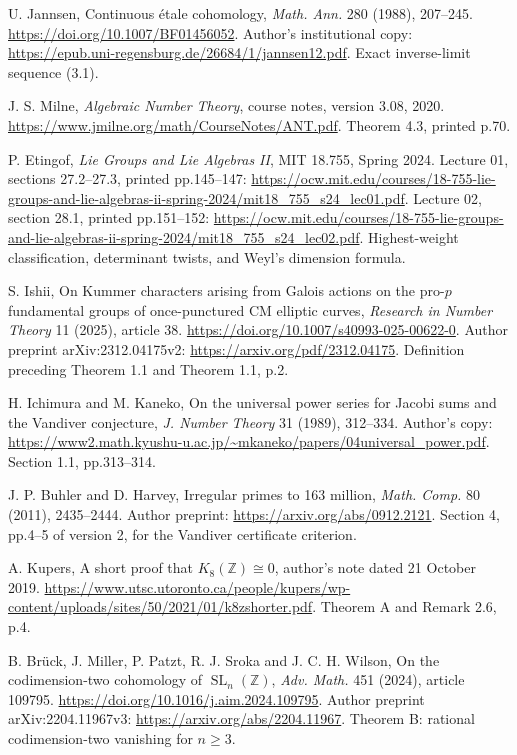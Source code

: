 U. Jannsen, Continuous \'etale cohomology,
\emph{Math. Ann.} 280 (1988), 207--245.
\url{https://doi.org/10.1007/BF01456052}.
Author's institutional copy:
\url{https://epub.uni-regensburg.de/26684/1/jannsen12.pdf}.
Exact inverse-limit sequence (3.1).

J. S. Milne, \emph{Algebraic Number Theory},
course notes, version 3.08, 2020.
\url{https://www.jmilne.org/math/CourseNotes/ANT.pdf}.
Theorem 4.3, printed p.70.

P. Etingof, \emph{Lie Groups and Lie Algebras II},
MIT 18.755, Spring 2024.
Lecture 01, sections 27.2--27.3, printed pp.145--147:
\url{https://ocw.mit.edu/courses/18-755-lie-groups-and-lie-algebras-ii-spring-2024/mit18_755_s24_lec01.pdf}.
Lecture 02, section 28.1, printed pp.151--152:
\url{https://ocw.mit.edu/courses/18-755-lie-groups-and-lie-algebras-ii-spring-2024/mit18_755_s24_lec02.pdf}.
Highest-weight classification, determinant twists, and Weyl's dimension formula.

S. Ishii,
On Kummer characters arising from Galois actions on the pro-\(p\)
fundamental groups of once-punctured CM elliptic curves,
\emph{Research in Number Theory} 11 (2025), article 38.
\url{https://doi.org/10.1007/s40993-025-00622-0}.
Author preprint arXiv:2312.04175v2:
\url{https://arxiv.org/pdf/2312.04175}.
Definition preceding Theorem 1.1 and Theorem 1.1, p.2.

H. Ichimura and M. Kaneko,
On the universal power series for Jacobi sums and the Vandiver conjecture,
\emph{J. Number Theory} 31 (1989), 312--334.
Author's copy:
\url{https://www2.math.kyushu-u.ac.jp/~mkaneko/papers/04universal_power.pdf}.
Section 1.1, pp.313--314.

J. P. Buhler and D. Harvey,
Irregular primes to 163 million,
\emph{Math. Comp.} 80 (2011), 2435--2444.
Author preprint:
\url{https://arxiv.org/abs/0912.2121}.
Section 4, pp.4--5 of version 2, for the Vandiver certificate criterion.

A. Kupers, A short proof that \(K_8(\mathbb Z)\cong0\),
author's note dated 21 October 2019.
\url{https://www.utsc.utoronto.ca/people/kupers/wp-content/uploads/sites/50/2021/01/k8zshorter.pdf}.
Theorem A and Remark 2.6, p.4.

B. Br\"uck, J. Miller, P. Patzt, R. J. Sroka and J. C. H. Wilson,
On the codimension-two cohomology of \(\operatorname{SL}_n(\mathbb Z)\),
\emph{Adv. Math.} 451 (2024), article 109795.
\url{https://doi.org/10.1016/j.aim.2024.109795}.
Author preprint arXiv:2204.11967v3:
\url{https://arxiv.org/abs/2204.11967}.
Theorem B: rational codimension-two vanishing for \(n\ge3\).

